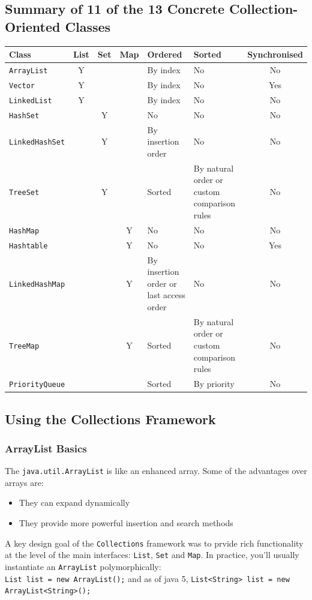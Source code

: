 \subsection{Summary of 11 of the 13 Concrete Collection-Oriented Classes}
\begin{center}
\begin{tabular}{lcccp{4cm}p{4cm}c}
    \textbf{Class} & \textbf{List} & \textbf{Set} & \textbf{Map} & 
    \textbf{Ordered} & \textbf{Sorted} & \textbf{Synchronised} \\
    \hline
    \verb#ArrayList# & Y & & & By index & No & No \\
    \verb#Vector# & Y & & & By index & No & Yes \\
    \verb#LinkedList# & Y & & & By index & No & No \\
    \hline
    \verb#HashSet# & & Y & & No & No & No \\
    \verb#LinkedHashSet# & & Y & & By insertion order & No & No \\
    \verb#TreeSet# & & Y & & Sorted & By natural order or custom comparison 
    rules & No \\
    \hline
    \verb#HashMap# & & & Y & No & No & No \\
    \verb#Hashtable# & & & Y & No & No & Yes \\
    \verb#LinkedHashMap# & & & Y & By insertion order or last access order & No 
    & No \\
    \verb#TreeMap# & & & Y & Sorted & By natural order or custom comparison 
    rules & No \\
    \hline
    \verb#PriorityQueue# & & & & Sorted & By priority & No \\
\end{tabular}
\end{center}

\subsection{Using the Collections Framework}
\subsubsection{ArrayList Basics}
The \verb#java.util.ArrayList# is like an enhanced array. Some of the 
advantages over arrays are:
\begin{itemize}
    \item They can expand dynamically
    \item They provide more powerful insertion and search methods
\end{itemize}
A key design goal of the \verb#Collections# framework was to prvide rich 
functionality at the level of the main interfaces: \verb#List#, \verb#Set# and 
\verb#Map#. In practice, you'll usually instantiate an \verb#ArrayList# 
polymorphically:\\
\verb#List list = new ArrayList();# and as of java 5,
\verb#List<String> list = new ArrayList<String>();#

